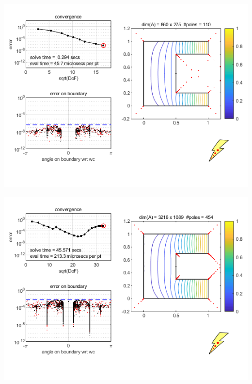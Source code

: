 \documentclass{seminar}
\begin{document}
\begin{slide} %
\begin{center}
\includegraphics[scale=0.7]{./PNG/rectSlit1}
\end{center}
\end{slide}
\begin{slide}
\begin{center}
\includegraphics[scale=0.7]{./PNG/rectSlit2}
\end{center}
\end{slide}
\end{document}
